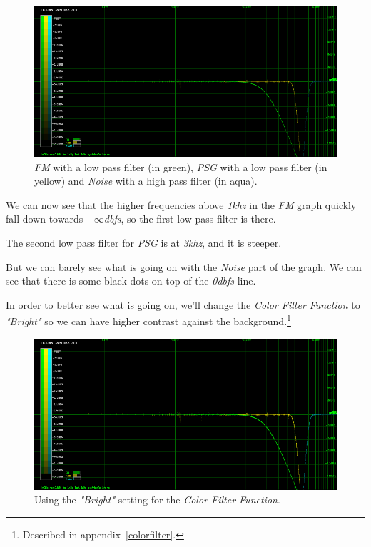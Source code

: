 \documentclass[10pt,a4paper]{report}
\newcommand{\khz}[1]{\textit{\mbox{#1\acrshort{khz}}}}
\newcommand{\db}[1]{\textit{\mbox{#1\acrshort{dbfs}}}}
\begin{document}
\begin{figure}[H]
	\centering
	\includegraphics[width=1.0\linewidth]{images/interpretation/Plot4-1-All.png}
	\caption[All Plotted]{\textit{FM} with a low pass filter (in green), \textit{PSG} with a low pass filter (in yellow) and \textit{Noise} with a high pass filter (in aqua).}
	\label{fig:plot4-1-all}
\end{figure}

We can now see that the higher frequencies above \khz{1} in the \textit{FM} graph quickly fall down towards \db{$-\infty$}, so the first low pass filter is there.

The second low pass filter for \textit{PSG} is at \khz{3}, and it is steeper.

But we can barely see what is going on with the \textit{Noise} part of the graph. We can see that there is some black dots on top of the \db{0} line.

In order to better see what is going on, we'll change the \textit{Color Filter Function} to \textit{"Bright"} so we can have higher contrast against the background.\footnote{Described in appendix~\ref{colorfilter}.}

\begin{figure}[H]
	\centering
	\includegraphics[width=1.0\linewidth]{images/interpretation/Plot4-2-All-sqrt.png}
	\caption[Using SQRT]{Using the \textit{"Bright"} setting for the \textit{Color Filter Function}.}
	\label{fig:plot4-2-all-sqrt}
\end{figure}
\end{document}

